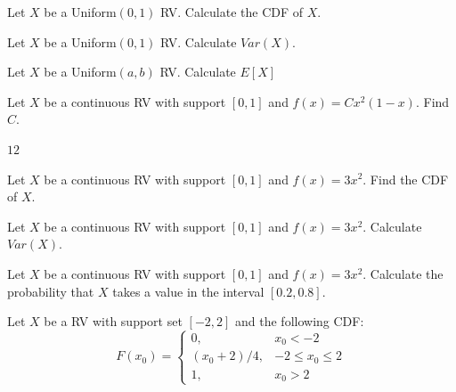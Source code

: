 \documentclass[addpoints,12pt]{exam}
\begin{document}
\begin{questions}

\question Let $X$ be a Uniform$(0,1)$ RV. Calculate the CDF of $X$.

\question Let $X$ be a Uniform$(0,1)$ RV. Calculate $Var(X)$.

\question Let $X$ be a Uniform$(a,b)$ RV. Calculate $E[X]$

\question Let $X$ be a continuous RV with support $[0,1]$ and $f(x) = C x^2(1 - x)$. Find $C$.
\begin{solution}
  $12$
\end{solution}

\question Let $X$ be a continuous RV with support $[0,1]$ and $f(x) = 3x^2$. Find the CDF of $X$.

\question Let $X$ be a continuous RV with support $[0,1]$ and $f(x) = 3x^2$. Calculate $Var(X)$.

\question Let $X$ be a continuous RV with support $[0,1]$ and $f(x) = 3x^2$. Calculate the probability that $X$ takes a value in the interval $[0.2, 0.8]$.

\question Let $X$ be a RV with support set $[-2,2]$ and the following CDF:
\[
  F(x_0) = \left\{
  \begin{array}{rr}
    0, & x_0 < -2\\
    (x_0 + 2)/4, & -2 \leq x_0 \leq 2\\
    1, & x_0 > 2
  \end{array}
  \right.
\]




\end{questions}
\end{document}
